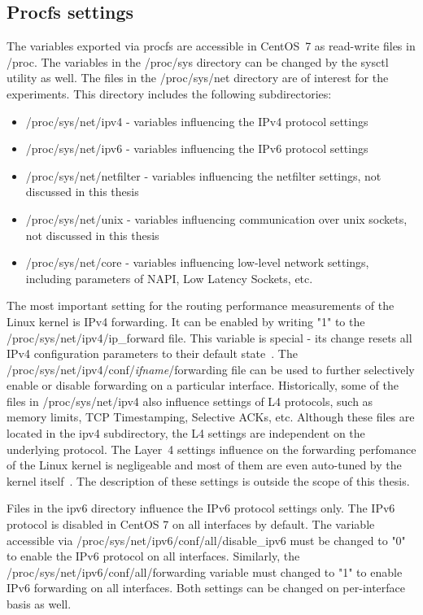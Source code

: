 
\subsection{Procfs settings}\label{subsec:analysis-settings-procfs}
The variables exported via procfs are accessible in CentOS~7 as read-write files in /proc.
The variables in the /proc/sys directory can be changed by the sysctl utility as well.
The files in the /proc/sys/net directory are of interest for the experiments.
This directory includes the following subdirectories:
\begin{itemize}
\item /proc/sys/net/ipv4 - variables influencing the IPv4 protocol settings
\item /proc/sys/net/ipv6 - variables influencing the IPv6 protocol settings
\item /proc/sys/net/netfilter - variables influencing the netfilter settings, not discussed in this thesis
\item /proc/sys/net/unix - variables influencing communication over unix sockets, not discussed in this thesis
\item /proc/sys/net/core - variables influencing low-level network settings, including parameters of NAPI, Low Latency Sockets, etc.
\end{itemize}

The most important setting for the routing performance measurements of the Linux kernel is IPv4 forwarding.
It can be enabled by writing "1" to the /proc/sys/net/ipv4/ip\_forward file.
This variable is special - its change resets all IPv4 configuration parameters to their default state~\cite{kernel-doc-ip-sysctl}.
The /proc/sys/net/ipv4/conf/{\it{ifname}}/forwarding file can be used
to further selectively enable or disable forwarding on a particular interface.
Historically, some of the files in /proc/sys/net/ipv4 also influence settings of L4 protocols,
such as memory limits, TCP Timestamping, Selective ACKs, etc.
Although these files are located in the ipv4 subdirectory, the L4 settings are independent on the underlying protocol.
The Layer~4 settings influence on the forwarding perfomance of the Linux kernel
is negligeable and most of them are even auto-tuned by the kernel itself~\cite{linux-kernel-networking}.
The description of these settings is outside the scope of this thesis.

Files in the ipv6 directory influence the IPv6 protocol settings only.
The IPv6 protocol is disabled in CentOS 7 on all interfaces by default.
The variable accessible via /proc/sys/net/ipv6/conf/all/disable\_ipv6 must be changed to "0" to
enable the IPv6 protocol on all interfaces.
Similarly, the /proc/sys/net/ipv6/conf/all/forwarding variable must changed to "1" to enable IPv6 forwarding on all interfaces.
Both settings can be changed on per-interface basis as well.

